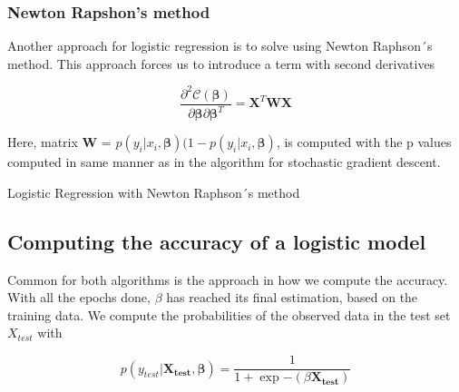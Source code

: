 \documentclass
[twocolumn,
secnumarabic,
nobibnotes,
aps,
prl,
reprint,
groupedaddress,
amsmath,
amssymb
]{revtex4-2}
\begin{document}
\subsubsection{Newton Rapshon's method}

Another approach for logistic regression is to solve using Newton Raphson´s method. This approach forces us to introduce a term with second derivatives

\begin{equation}
  \nonumber
  \frac{\partial^2 \mathcal{C}(\boldsymbol{\beta})}{\partial \boldsymbol{\beta}\partial \boldsymbol{\beta}^T} = \boldsymbol{X}^T\boldsymbol{W}\boldsymbol{X}
\end{equation}

Here, matrix $\boldsymbol{W}$ = $p(y_i\vert x_i,\boldsymbol{\beta})(1-p(y_i\vert x_i,\boldsymbol{\beta})$, is computed with the p values computed in same manner as in the algorithm for stochastic gradient descent.

\begin{algorithm}
  \Return{$\theta$}
  \caption{\label{alg:newtonraphson}Logistic Regression with Newton Raphson´s method}
\end{algorithm}

\subsection{Computing the accuracy of a logistic model}
Common for both algorithms is the approach in how we compute the accuracy. With all the epochs done, $\beta$ has reached its final estimation, based on the training data. We compute the probabilities of the observed data in the test set $X_{test}$ with

\begin{equation}
  \nonumber
  p(y_{test}|\bm{X_{test}},\bm{\beta}) = \frac{1}{1+\exp{-(\beta \boldsymbol{X_{test}})}}
\end{equation}
\end{document}
